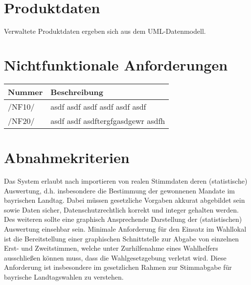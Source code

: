 \documentclass[a4paper,12pt]{article}
\newcommand\addrow[2]{#1 &#2\\ }
\newcommand\addheading[2]{#1 &#2\\ \hline}
\newcommand\tabularhead{\begin{tabular}{lp{13cm}}
\hline
}
\newenvironment{usecase}{\tabularhead}
{\hline\end{tabular}}
\begin{document}
\section{Produktdaten}
Verwaltete Produktdaten ergeben sich aus dem UML-Datenmodell.

\section{Nichtfunktionale Anforderungen}
\begin{usecase}
  \addheading{Nummer}{Beschreibung} 
  \addrow{/NF10/}{asdf asdf asdf asdf asdf asdf }
  \addrow{/NF20/}{ asdf asdf asdftergfgasdgewr asdfh}
\end{usecase}

\section{Abnahmekriterien}
Das System erlaubt nach importieren von realen Stimmdaten deren (statistische) Auswertung, d.h. 
insbesondere die Bestimmung der gewonnenen Mandate im bayrischen Landtag. Dabei müssen gesetzliche
Vorgaben akkurat abgebildet sein sowie Daten sicher, Datenschutzrechtlich korrekt und integer gehalten
werden. Des weiteren sollte eine graphisch Ansprechende Darstellung der (statistischen) Auswertung
einsehbar sein. 
Minimale Anforderung für den Einsatz im Wahllokal ist die Bereitstellung einer graphischen Schnittstelle zur Abgabe
von einzelnen Erst- und Zweitstimmen, welche unter Zurhilfenahme eines Wahlhelfers ausschließen können muss,
dass die Wahlgesetzgebung verletzt wird. Diese Anforderung ist insbesondere im gesetzlichen Rahmen zur
Stimmabgabe für bayrische Landtagswahlen zu verstehen.

\clearpage
 
\end{document}
